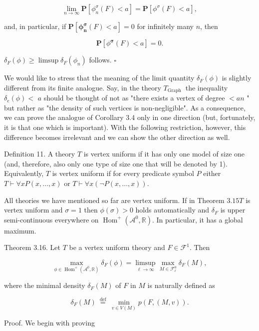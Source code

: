\documentclass[10pt]{article}
\begin{document}
$$
\lim _{n \rightarrow \infty} \mathbf{P}\left[\phi_{n}^{\sigma}(F)<a\right]=\mathbf{P}\left[\phi^{\sigma}(F)<a\right],
$$

and, in particular, if $\mathbf{P}\left[\boldsymbol{\phi}_{\boldsymbol{n}}^{\boldsymbol{\sigma}}(F)<a\right]=0$ for infinitely many $n$, then

$$
\mathbf{P}\left[\phi^{\boldsymbol{\sigma}}(F)<a\right]=0 .
$$

$\delta_{F}(\phi) \geq \limsup \delta_{F}\left(\phi_{n}\right)$ follows. \(\square\)

We would like to stress that the meaning of the limit quantity $\delta_{F}(\phi)$ is slightly different from its finite analogue. Say, in the theory $T_{\text {Graph }}$ the inequality $\delta_{e}(\phi)<$ $a$ should be thought of not as "there exists a vertex of degree $<a n$ " but rather as "the density of such vertices is non-negligible". As a consequence, we can prove the analogue of Corollary 3.4 only in one direction (but, fortunately, it is that one which is important). With the following restriction, however, this difference becomes irrelevant and we can show the other direction as well.

Definition 11. A theory $T$ is vertex uniform if it has only one model of size one (and, therefore, also only one type of size one that will be denoted by 1). Equivalently, $T$ is vertex uniform if for every predicate symbol $P$ either $T \vdash \forall x P(x, \ldots, x)$ or $T \vdash \forall x(\neg P(x, \ldots, x))$.

All theories we have mentioned so far are vertex uniform. If in Theorem $3.15 T$ is vertex uniform and $\sigma=1$ then $\phi(\sigma)>0$ holds automatically and $\delta_{F}$ is upper semi-continuous everywhere on $\operatorname{Hom}^{+}\left(\mathcal{A}^{0}, \mathbb{R}\right)$. In particular, it has a global maximum.

Theorem 3.16. Let $T$ be a vertex uniform theory and $F \in \mathcal{F}^{1}$. Then

$$
\max _{\phi \in \operatorname{Hom}^{+}\left(\mathcal{A}^{0}, \mathbb{R}\right)} \delta_{F}(\phi)=\limsup _{\ell \rightarrow \infty} \max _{M \in \mathcal{F}_{\ell}^{0}} \delta_{F}(M),
$$

where the minimal density $\delta_{F}(M)$ of $F$ in $M$ is naturally defined as

$$
\delta_{F}(M) \stackrel{\text { def }}{=} \min _{v \in V(M)} p(F,(M, v)) .
$$

Proof. We begin with proving
\end{document}
